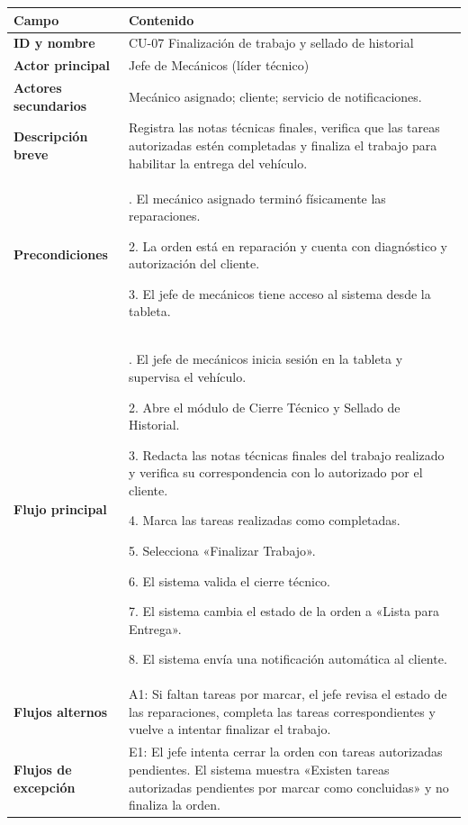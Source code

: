 {\def\LTcaptype{none} %
\begin{longtable}[]{@{}
  >{\raggedright\arraybackslash}p{}
  >{\raggedright\arraybackslash}p{}@{}}
\toprule\noalign{}
\begin{minipage}[b]{\linewidth}\raggedright
\textbf{Campo}
\end{minipage} & \begin{minipage}[b]{\linewidth}\raggedright
\textbf{Contenido}
\end{minipage} \\
\midrule\noalign{}
\endhead
\bottomrule\noalign{}
\endlastfoot
\textbf{ID y nombre} & CU-07 Finalización de trabajo y sellado de
historial \\
\textbf{Actor principal} & Jefe de Mecánicos (líder técnico) \\
\textbf{Actores secundarios} & Mecánico asignado; cliente; servicio de
notificaciones. \\
\textbf{Descripción breve} & Registra las notas técnicas finales,
verifica que las tareas autorizadas estén completadas y finaliza el
trabajo para habilitar la entrega del vehículo. \\
\textbf{Precondiciones} & 1. El mecánico asignado terminó físicamente
las reparaciones.

2. La orden está en reparación y cuenta con diagnóstico y autorización
del cliente.

3. El jefe de mecánicos tiene acceso al sistema desde la tableta. \\
\textbf{Flujo principal} & 1. El jefe de mecánicos inicia sesión en la
tableta y supervisa el vehículo.

2. Abre el módulo de Cierre Técnico y Sellado de Historial.

3. Redacta las notas técnicas finales del trabajo realizado y verifica
su correspondencia con lo autorizado por el cliente.

4. Marca las tareas realizadas como completadas.

5. Selecciona «Finalizar Trabajo».

6. El sistema valida el cierre técnico.

7. El sistema cambia el estado de la orden a «Lista para Entrega».

8. El sistema envía una notificación automática al cliente. \\
\textbf{Flujos alternos} & A1: Si faltan tareas por marcar, el jefe
revisa el estado de las reparaciones, completa las tareas
correspondientes y vuelve a intentar finalizar el trabajo. \\
\textbf{Flujos de excepción} & E1: El jefe intenta cerrar la orden con
tareas autorizadas pendientes. El sistema muestra «Existen tareas
autorizadas pendientes por marcar como concluidas» y no finaliza la
orden.


\end{longtable}}
